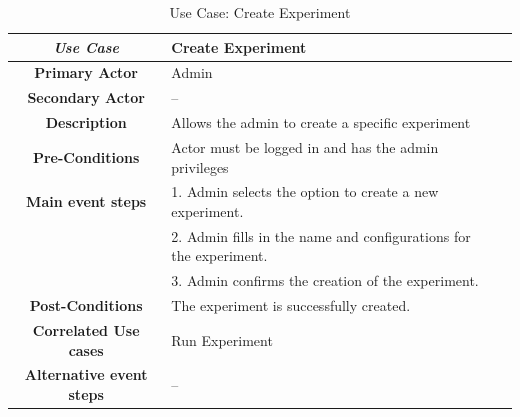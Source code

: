 \begin{table}[ht!]
    \centering
    \caption{Use Case: Create Experiment}
    \begin{tabularx}{\textwidth}{|Sl|S{X}|}
        \hline
        \textbf{\textit{Use Case}}       & \textbf{Create Experiment}                                        \\ \hline
        \textbf{Primary Actor}           & Admin                                                             \\ \hline
        \textbf{Secondary Actor}         & --                                                                \\ \hline
        \textbf{Description}             & Allows the admin to create a specific experiment                  \\ \hline
        \textbf{Pre-Conditions}          & Actor must be logged in and has the admin privileges              \\ \hline
        \textbf{Main event steps}        & 1. Admin selects the option to create a new experiment.           \\
                                         & 2. Admin fills in the name and configurations for the experiment. \\
                                         & 3. Admin confirms the creation of the experiment.                 \\ \hline
        \textbf{Post-Conditions}         & The experiment is successfully created.                           \\ \hline
        \textbf{Correlated Use cases}    & Run Experiment                                                    \\ \hline
        \textbf{Alternative event steps} & --                                                                \\ \hline
    \end{tabularx}
\end{table}



